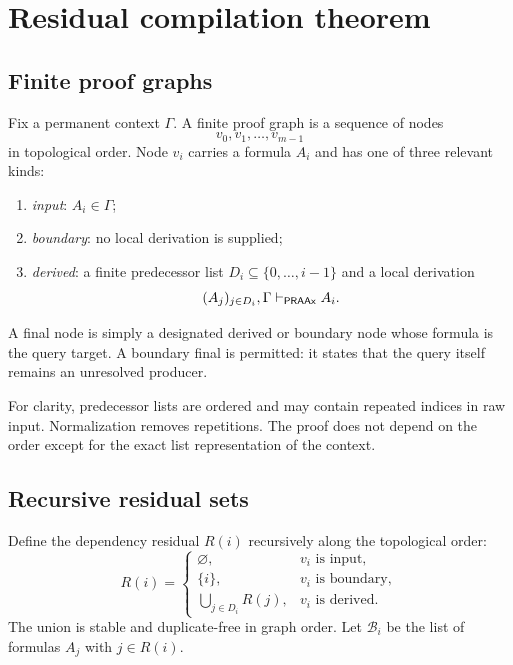 \section{Residual compilation theorem}
\label{sec:residual-compilation}

\subsection{Finite proof graphs}

Fix a permanent context \(\Gamma\).  A finite proof graph is a sequence of nodes
\[
 v_0,v_1,\ldots,v_{m-1}
\]
in topological order.  Node \(v_i\) carries a formula \(A_i\) and has one of three relevant kinds:

\begin{enumerate}
\item \emph{input}: \(A_i\in\Gamma\);
\item \emph{boundary}: no local derivation is supplied;
\item \emph{derived}: a finite predecessor list \(D_i\subseteq\{0,\ldots,i-1\}\) and a local derivation
\begin{equation}\label{eq:local-node-proof}
 (A_j)_{j\in D_i},\Gamma\vdash_{\mathsf{PRAAx}} A_i.
\end{equation}
\end{enumerate}
A final node is simply a designated derived or boundary node whose formula is the query target.  A boundary final is permitted: it states that the query itself remains an unresolved producer.

For clarity, predecessor lists are ordered and may contain repeated indices in raw input.  Normalization removes repetitions.  The proof does not depend on the order except for the exact list representation of the context.

\subsection{Recursive residual sets}

Define the dependency residual \(R(i)\) recursively along the topological order:
\[
 R(i)=
 \begin{cases}
  \varnothing,&v_i\text{ is input},\\
  \{i\},&v_i\text{ is boundary},\\
  \displaystyle\bigcup_{j\in D_i}R(j),&v_i\text{ is derived}.
 \end{cases}
\]
The union is stable and duplicate-free in graph order.  Let \(\mathcal B_i\) be the list of formulas \(A_j\) with \(j\in R(i)\).

